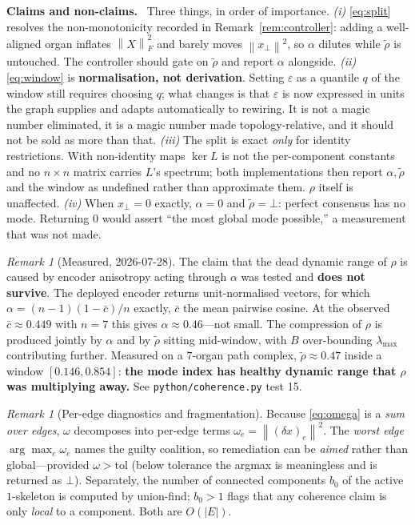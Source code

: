 \documentclass[11pt]{article}
\theoremstyle{definition}
\theoremstyle{plain}
\theoremstyle{remark}
\newtheorem{remark}[definition]{Remark}
\newcommand{\Hon}{\noindent\textbf{\color{honestycol}Claims and non-claims.}\ }
\newcommand{\norm}[1]{\left\lVert #1 \right\rVert}
\begin{document}
\begin{hon}\Hon
Three things, in order of importance.
\emph{(i)} \eqref{eq:split} resolves the non-monotonicity recorded in
Remark~\ref{rem:controller}: adding a well-aligned organ inflates $\norm{X}_F^2$ and
barely moves $\norm{x_\perp}^2$, so $\alpha$ dilutes while $\tilde\rho$ is untouched.
The controller should gate on $\tilde\rho$ and report $\alpha$ alongside.
\emph{(ii)} \eqref{eq:window} is \textbf{normalisation, not derivation}. Setting
$\varepsilon$ as a quantile $q$ of the window still requires choosing $q$; what changes
is that $\varepsilon$ is now expressed in units the graph supplies and adapts
automatically to rewiring. It is not a magic number eliminated, it is a magic number
made topology-relative, and it should not be sold as more than that.
\emph{(iii)} The split is exact \emph{only} for identity restrictions. With
non-identity maps $\ker L$ is not the per-component constants and no $n\times n$ matrix
carries $L$'s spectrum; both implementations then report $\alpha,\tilde\rho$ and the
window as undefined rather than approximate them. $\rho$ itself is unaffected.
\emph{(iv)} When $x_\perp=0$ exactly, $\alpha=0$ and $\tilde\rho=\bot$: perfect
consensus has no mode. Returning $0$ would assert ``the most global mode possible,''
a measurement that was not made.
\end{hon}

\begin{remark}[Measured, 2026-07-28]\label{rem:e1measured}
The claim that the dead dynamic range of $\rho$ is caused by encoder anisotropy
acting through $\alpha$ was tested and \textbf{does not survive}. The deployed encoder
returns unit-normalised vectors, for which $\alpha=(n-1)(1-\bar c)/n$ exactly, $\bar c$
the mean pairwise cosine. At the observed $\bar c\approx0.449$ with $n=7$ this gives
$\alpha\approx0.46$---not small. The compression of $\rho$ is produced jointly by
$\alpha$ and by $\tilde\rho$ sitting mid-window, with $B$ over-bounding
$\lambda_{\max}$ contributing further. Measured on a $7$-organ path complex,
$\tilde\rho\approx0.47$ inside a window $[0.146,0.854]$: \textbf{the mode index has
healthy dynamic range that $\rho$ was multiplying away.} See
\texttt{python/coherence.py} test 15.
\end{remark}

\begin{remark}[Per-edge diagnostics and fragmentation]\label{rem:diag}
Because \eqref{eq:omega} is a \emph{sum over edges}, $\omega$ decomposes into
per-edge terms $\omega_e=\norm{(\delta x)_e}^2$. The \emph{worst edge}
$\arg\max_e\omega_e$ names the guilty coalition, so remediation can be \emph{aimed}
rather than global---provided $\omega>\text{tol}$ (below tolerance the argmax is
meaningless and is returned as $\bot$). Separately, the number of connected components
$b_0$ of the active $1$-skeleton is computed by union-find; $b_0>1$ flags that any
coherence claim is only \emph{local} to a component. Both are $O(|E|)$.
\end{remark}
\end{document}
